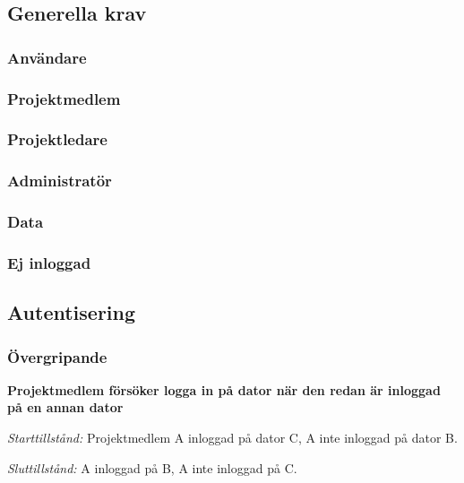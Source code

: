 \documentclass[a4paper]{article}
\begin{document}
\begin{FT}

\subsection{Generella krav}

\subsubsection{Användare}
\subsubsection{Projektmedlem}
\subsubsection{Projektledare}
\subsubsection{Administratör}
\subsubsection{Data}
\subsubsection{Ej inloggad}



\subsection{Autentisering}

\subsubsection{Övergripande}


\item
\textbf{Projektmedlem försöker logga in på dator när den redan är inloggad på en annan dator}

\emph{Starttillstånd:} Projektmedlem A inloggad på dator C, A inte inloggad på dator B.

\emph{Sluttillstånd:} A inloggad på B, A inte inloggad på C.


\end{FT}
\end{document}
